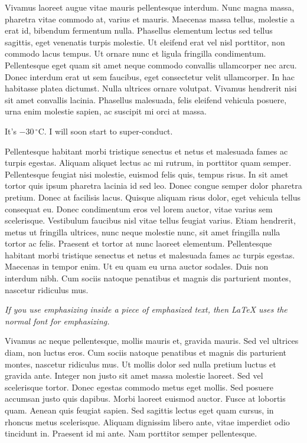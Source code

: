 Vivamus laoreet augue vitae mauris pellentesque interdum. Nunc magna massa, pharetra vitae commodo at, varius et mauris. Maecenas massa tellus, molestie a erat id, bibendum fermentum nulla. Phasellus elementum lectus sed tellus sagittis, eget venenatis turpis molestie. Ut eleifend erat vel nisl porttitor, non commodo lacus tempus. Ut ornare nunc et ligula fringilla condimentum. Pellentesque eget quam sit amet neque commodo convallis ullamcorper nec arcu. Donec interdum erat ut sem faucibus, eget consectetur velit ullamcorper. In hac habitasse platea dictumst. Nulla ultrices ornare volutpat. Vivamus hendrerit nisi sit amet convallis lacinia. Phasellus malesuada, felis eleifend vehicula posuere, urna enim molestie sapien, ac suscipit mi orci at massa.

It’s $-30\,^{\circ}\mathrm{C}$. I will soon start to super-conduct.

Pellentesque habitant morbi tristique senectus et netus et malesuada fames ac turpis egestas. Aliquam aliquet lectus ac mi rutrum, in porttitor quam semper. Pellentesque feugiat nisi molestie, euismod felis quis, tempus risus. In sit amet tortor quis ipsum pharetra lacinia id sed leo. Donec congue semper dolor pharetra pretium. Donec at facilisis lacus. Quisque aliquam risus dolor, eget vehicula tellus consequat eu. Donec condimentum eros vel lorem auctor, vitae varius sem scelerisque.
Vestibulum faucibus nisl vitae tellus feugiat varius. Etiam hendrerit, metus ut fringilla ultrices, nunc neque molestie nunc, sit amet fringilla nulla tortor ac felis. Praesent et tortor at nunc laoreet elementum. Pellentesque habitant morbi tristique senectus et netus et malesuada fames ac turpis egestas. Maecenas in tempor enim. Ut eu quam eu urna auctor sodales. Duis non interdum nibh. Cum sociis natoque penatibus et magnis dis parturient montes, nascetur ridiculus mus.\newline

\emph{If you use
  emphasizing inside a piece
  of emphasized text, then
  \LaTeX{} uses the
  \emph{normal} font for
  emphasizing.}\newline

Vivamus ac neque pellentesque, mollis mauris et, gravida mauris. Sed vel ultrices diam, non luctus eros. Cum sociis natoque penatibus et magnis dis parturient montes, nascetur ridiculus mus. Ut mollis dolor sed nulla pretium luctus et gravida ante. Integer non justo sit amet massa molestie laoreet. Sed vel scelerisque tortor. Donec egestas commodo metus eget mollis. Sed posuere accumsan justo quis dapibus. Morbi laoreet euismod auctor. Fusce at lobortis quam. Aenean quis feugiat sapien. Sed sagittis lectus eget quam cursus, in rhoncus metus scelerisque. Aliquam dignissim libero ante, vitae imperdiet odio tincidunt in. Praesent id mi ante. Nam porttitor semper pellentesque.

